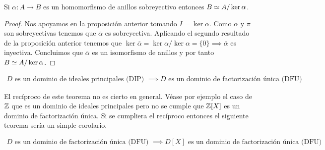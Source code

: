 \begin{thm}
	Si $\alpha: A \to B$ es un homomorfismo de anillos sobreyectivo entonces $B \simeq A / \ker \alpha$.
\end{thm}

	\begin{figure}[h]
	\centering
\end{figure}

\begin{proof}
	Nos apoyamos en la proposición anterior tomando $I = \ker \alpha$. Como $\alpha$ y $\pi$ son sobreyectivas tenemos que $\overline{\alpha}$ es sobreyectiva. Aplicando el segundo resultado de la proposición anterior tenemos que $\ker \overline{\alpha} = \ker \alpha / \ker \alpha = \{ 0\} \implies \overline{\alpha}$ es inyectiva. Concluimos que $\overline{\alpha}$ es un isomorfismo de anillos y por tanto $B \simeq A / \ker \alpha$.
\end{proof}


\begin{thm}
	\begin{align*}
	D \text{ es un dominio de ideales principales (DIP) } \implies D \text{ es un dominio de factorización única (DFU)}
	\end{align*}
\end{thm}

El recíproco de este teorema no es cierto en general. Véase por ejemplo el caso de $\mathbb{Z}$ que es un dominio de ideales principales pero no se cumple que $\mathbb{Z}[X]$ es un dominio de factorización única. Si se cumpliera el recíproco entonces el siguiente teorema sería un simple corolario.

\begin{thm}
	\begin{align*}
	D \text{ es un dominio de factorización única (DFU) } \implies D[X] \text{ es un dominio de factorización única (DFU)}
	\end{align*}
\end{thm}

